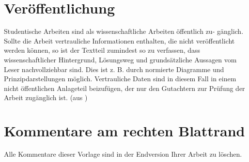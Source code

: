 \section{Veröffentlichung}
Studentische Arbeiten sind als wissenschaftliche Arbeiten öffentlich zu- gänglich. Sollte die Arbeit vertrauliche Informationen enthalten, die nicht veröffentlicht werden können, so ist der Textteil zumindest so zu verfassen, dass wissenschaftlicher Hintergrund, Lösungsweg und grundsätzliche Aussagen vom Leser nachvollziehbar sind. Dies ist z. B. durch normierte Diagramme und Prinzipdarstellungen möglich. Vertrauliche Daten sind in diesem Fall in einem nicht öffentlichen Anlageteil beizufügen, der nur den Gutachtern zur Prüfung der Arbeit zugänglich ist. (aus \cite{Dokument})

\section{Kommentare am rechten Blattrand}
Alle Kommentare dieser Vorlage sind in der Endversion Ihrer Arbeit zu löschen.


